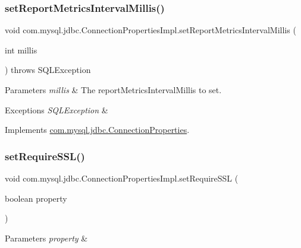 \subsubsection{\texorpdfstring{set\+Report\+Metrics\+Interval\+Millis()}{setReportMetricsIntervalMillis()}}
{\footnotesize\ttfamily void com.\+mysql.\+jdbc.\+Connection\+Properties\+Impl.\+set\+Report\+Metrics\+Interval\+Millis (\begin{DoxyParamCaption}\item[{int}]{millis }\end{DoxyParamCaption}) throws S\+Q\+L\+Exception}


\begin{DoxyParams}{Parameters}
{\em millis} & The report\+Metrics\+Interval\+Millis to set. \\
\hline
\end{DoxyParams}

\begin{DoxyExceptions}{Exceptions}
{\em S\+Q\+L\+Exception} & \\
\hline
\end{DoxyExceptions}


Implements \mbox{\hyperlink{interfacecom_1_1mysql_1_1jdbc_1_1_connection_properties_a98e28b386c63acdab88d1fdc0531d8ce}{com.\+mysql.\+jdbc.\+Connection\+Properties}}.

\mbox{\label{classcom_1_1mysql_1_1jdbc_1_1_connection_properties_impl_a7a7fd30f253879012fa5f2b7814cd33c}} 
\subsubsection{\texorpdfstring{set\+Require\+S\+S\+L()}{setRequireSSL()}}
{\footnotesize\ttfamily void com.\+mysql.\+jdbc.\+Connection\+Properties\+Impl.\+set\+Require\+S\+SL (\begin{DoxyParamCaption}\item[{boolean}]{property }\end{DoxyParamCaption})}


\begin{DoxyParams}{Parameters}
{\em property} & \\
\hline
\end{DoxyParams}


